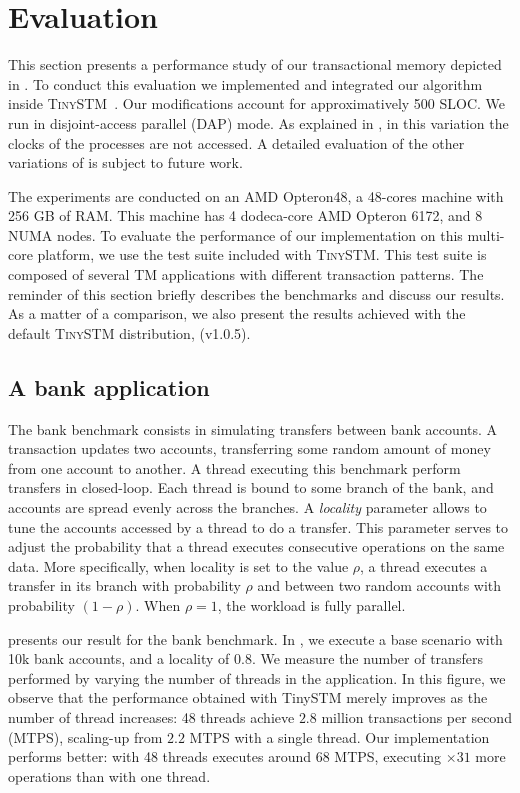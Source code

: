 \section{Evaluation}

This section presents a performance study of our \SPSER transactional memory depicted in .
To conduct this evaluation we implemented and integrated our algorithm inside \textsc{TinySTM}~\cite{FelberFMR10}.
Our modifications account for approximatively 500 SLOC.
We run  in disjoint-access parallel (DAP) mode.
As explained in , in this variation the clocks of the processes are not accessed.
A detailed evaluation of the other variations of  is subject to future work.

The experiments are conducted on an AMD Opteron48, a 48-cores machine with 256 GB of RAM. 
This machine has 4 dodeca-core AMD Opteron 6172, and 8 NUMA nodes.
To evaluate the performance of our implementation on this multi-core platform, we use the test suite included with \textsc{TinySTM}.
This test suite is composed of several TM applications with different transaction patterns.
The reminder of this section briefly describes the benchmarks and discuss our results.
As a matter of a comparison, we also present the results achieved with the default \textsc{TinySTM} distribution, (v1.0.5).
 
\subsection{A bank application}

The bank benchmark consists in simulating transfers between bank accounts.
A transaction updates two accounts, transferring some random amount of money from one account to another.
A thread executing this benchmark perform transfers in closed-loop.
Each thread is bound to some branch of the bank, and accounts are spread evenly across the branches.
A \emph{locality} parameter allows to tune the accounts accessed by a thread to do a transfer.
This parameter serves to adjust the probability that a thread executes consecutive operations on the same data.
More specifically, when locality is set to the value $\rho$, a thread executes a transfer in its branch with probability $\rho$ and between two random accounts with probability $(1-\rho)$.
When $\rho=1$, the workload is fully parallel.

 presents our result for the bank benchmark.
In , we execute a base scenario with 10k bank accounts, and a locality of 0.8.
We measure the number of transfers performed by varying the number of threads in the application.
In this figure, we observe that the performance obtained with TinySTM merely improves as the number of thread increases: 48 threads achieve $2.8$ million transactions per second (MTPS), scaling-up from $2.2$ MTPS with a single thread.
Our implementation performs better: with 48 threads  executes around 68 MTPS, executing $\times 31$ more operations than with one thread.

